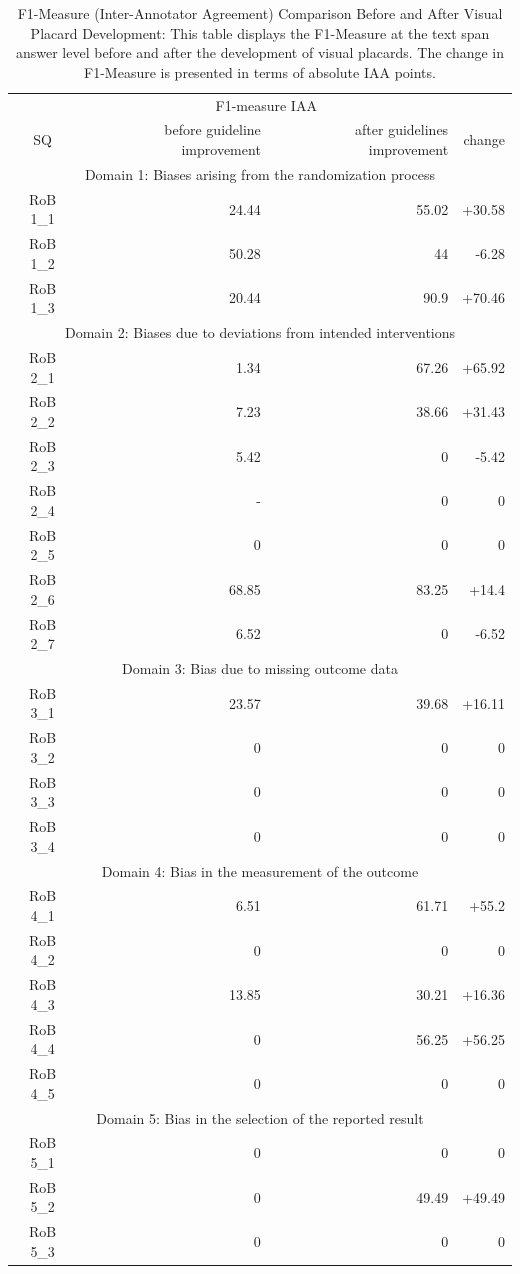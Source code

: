 \documentclass[sn-mathphys,Numbered]{sn-jnl}%
\theoremstyle{thmstyleone}%
\theoremstyle{thmstyletwo}%
\theoremstyle{thmstylethree}%
\begin{document}
\begin{table}[htb]
    \caption{F1-Measure (Inter-Annotator Agreement) Comparison Before and After Visual Placard Development: This table displays the F1-Measure at the text span answer level before and after the development of visual placards. The change in F1-Measure is presented in terms of absolute IAA points.}
    \label{tab:IAA_sq}
    \centering
    \begin{tabular}{crrr}
    \toprule[1.0pt]
         & \multicolumn{2}{c}{F1-measure IAA} & \\
        SQ & before guideline improvement & after guidelines improvement & change \\
    \midrule[1.0pt]
        \multicolumn{4}{c}{Domain 1: Biases arising from the randomization process} \\
        \hline
        RoB 1\_1 & 24.44 & 55.02 & +30.58 \\ 
        RoB 1\_2 & 50.28 & 44 & -6.28 \\ 
        RoB 1\_3 & 20.44 & 90.9 & +70.46 \\
        \hline
        \multicolumn{4}{c}{Domain 2: Biases due to deviations from intended interventions} \\
        \hline
        RoB 2\_1 & 1.34 & 67.26 & +65.92 \\ 
        RoB 2\_2 & 7.23 & 38.66 & +31.43 \\ 
        RoB 2\_3 & 5.42 & 0 & -5.42 \\ 
        RoB 2\_4 & - & 0 & 0 \\ 
        RoB 2\_5 & 0 & 0 & 0 \\ 
        RoB 2\_6 & 68.85 & 83.25 & +14.4 \\ 
        RoB 2\_7 & 6.52 & 0 & -6.52 \\ 
        \hline
        \multicolumn{4}{c}{Domain 3: Bias due to missing outcome data} \\
        \hline
        RoB 3\_1 & 23.57 & 39.68 & +16.11 \\ 
        RoB 3\_2 & 0 & 0 & 0 \\ 
        RoB 3\_3 & 0 & 0 & 0 \\ 
        RoB 3\_4 & 0 & 0 & 0 \\ 
        \hline
        \multicolumn{4}{c}{Domain 4: Bias in the measurement of the outcome} \\
        \hline
        RoB 4\_1 & 6.51 & 61.71 & +55.2 \\ 
        RoB 4\_2 & 0 & 0 & 0 \\ 
        RoB 4\_3 & 13.85 & 30.21 & +16.36 \\ 
        RoB 4\_4 & 0 & 56.25 & +56.25 \\ 
        RoB 4\_5 & 0 & 0 & 0 \\ 
        \hline
        \multicolumn{4}{c}{Domain 5: Bias in the selection of the reported result} \\
        \hline
        RoB 5\_1 & 0 & 0 & 0 \\ 
        RoB 5\_2 & 0 & 49.49 & +49.49 \\ 
        RoB 5\_3 & 0 & 0 & 0 \\
    \bottomrule[1.0pt]
    \end{tabular}
\end{table}
%
%
%
\end{document}
